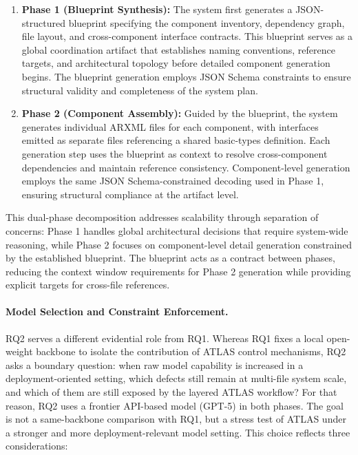 \documentclass[acmlarge,nonacm]{acmart}
\theoremstyle{acmplain}
\theoremstyle{acmdefinition}
\begin{document}
\begin{enumerate}[leftmargin=*,nosep]
\item \textbf{Phase 1 (Blueprint Synthesis):} The system first generates a JSON-structured blueprint specifying the component inventory, dependency graph, file layout, and cross-component interface contracts. This blueprint serves as a global coordination artifact that establishes naming conventions, reference targets, and architectural topology before detailed component generation begins. The blueprint generation employs JSON Schema constraints to ensure structural validity and completeness of the system plan.

\item \textbf{Phase 2 (Component Assembly):} Guided by the blueprint, the system generates individual ARXML files for each component, with interfaces emitted as separate files referencing a shared basic-types definition. Each generation step uses the blueprint as context to resolve cross-component dependencies and maintain reference consistency. Component-level generation employs the same JSON Schema-constrained decoding used in Phase 1, ensuring structural compliance at the artifact level.
\end{enumerate}

This dual-phase decomposition addresses scalability through separation of concerns: Phase 1 handles global architectural decisions that require system-wide reasoning, while Phase 2 focuses on component-level detail generation constrained by the established blueprint. The blueprint acts as a contract between phases, reducing the context window requirements for Phase 2 generation while providing explicit targets for cross-file references.

\paragraph{Model Selection and Constraint Enforcement.} RQ2 serves a different evidential role from RQ1. Whereas RQ1 fixes a local open-weight backbone to isolate the contribution of ATLAS control mechanisms, RQ2 asks a boundary question: when raw model capability is increased in a deployment-oriented setting, which defects still remain at multi-file system scale, and which of them are still exposed by the layered ATLAS workflow? For that reason, RQ2 uses a frontier API-based model (GPT-5) in both phases. The goal is not a same-backbone comparison with RQ1, but a stress test of ATLAS under a stronger and more deployment-relevant model setting. This choice reflects three considerations:
\end{document}
